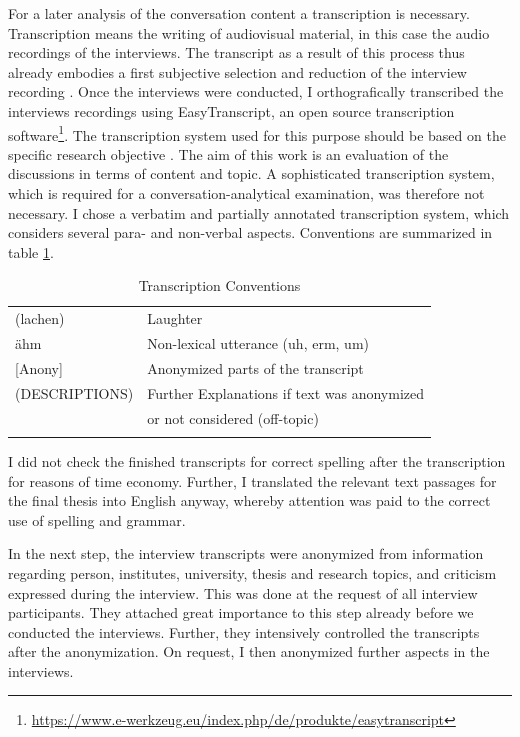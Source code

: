 \documentclass[12pt, a4paper, titlepage, oneside, abstract=true, toc=listof, toc=bibliography, BCOR=1cm]{scrreprt}
\begin{document}
For a later analysis of the conversation content a transcription is necessary. Transcription means the writing of audiovisual material, in this case the audio recordings of the interviews. The transcript as a result of this process thus already embodies a first subjective selection and reduction of the interview recording \citep[p. 321]{Edwards2003}. Once the interviews were conducted, I orthografically transcribed the interviews recordings using EasyTranscript, an open source transcription software\footnote{\url{https://www.e-werkzeug.eu/index.php/de/produkte/easytranscript}}. The transcription system used for this purpose should be based on the specific research objective \citep[p. 331]{Edwards2003}. The aim of this work is an evaluation of the discussions in terms of content and topic. A sophisticated transcription system, which is required for a conversation-analytical examination, was therefore not necessary. I chose a verbatim and partially annotated transcription system, which considers several para- and non-verbal aspects. Conventions are summarized in table \ref{tab:conventions}.

\small
\begin{table}
\caption{Transcription Conventions}
\label{tab:conventions}
\centering
\begin{tabular}{ll}
 & \\
\hline
\hline
 	(lachen) & Laughter\\
 	ähm	& Non-lexical utterance (uh, erm, um)\\
 	{[Anony]} & Anonymized parts of the transcript\\
	(DESCRIPTIONS)	& Further Explanations if text was anonymized\\
	               & or not considered (off-topic)\\
\hline
 & \\
\end{tabular}
\end{table}
\normalsize

I did not check the finished transcripts for correct spelling after the transcription for reasons of time economy. Further, I translated the relevant text passages for the final thesis into English anyway, whereby attention was paid to the correct use of spelling and grammar.

In the next step, the interview transcripts were anonymized from information regarding person, institutes, university, thesis and research topics, and criticism expressed during the interview. This was done at the request of all interview participants. They attached great importance to this step already before we conducted the interviews. Further, they intensively controlled the transcripts after the anonymization. On request, I then anonymized further aspects in the interviews.
\end{document}

